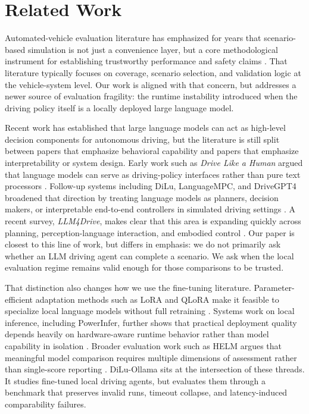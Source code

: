 \section{Related Work}

Automated-vehicle evaluation literature has emphasized for years that scenario-based simulation is not just a convenience layer, but a core methodological instrument for establishing trustworthy performance and safety claims \cite{riedmaier2020scenario}. That literature typically focuses on coverage, scenario selection, and validation logic at the vehicle-system level. Our work is aligned with that concern, but addresses a newer source of evaluation fragility: the runtime instability introduced when the driving policy itself is a locally deployed large language model.

Recent work has established that large language models can act as high-level decision components for autonomous driving, but the literature is still split between papers that emphasize behavioral capability and papers that emphasize interpretability or system design. Early work such as \emph{Drive Like a Human} argued that language models can serve as driving-policy interfaces rather than pure text processors \cite{fu2023drivelikehuman}. Follow-up systems including DiLu, LanguageMPC, and DriveGPT4 broadened that direction by treating language models as planners, decision makers, or interpretable end-to-end controllers in simulated driving settings \cite{wen2023dilu,sha2023languagempc,xu2023drivegpt4}. A recent survey, \emph{LLM4Drive}, makes clear that this area is expanding quickly across planning, perception-language interaction, and embodied control \cite{yang2023llm4drive}. Our paper is closest to this line of work, but differs in emphasis: we do not primarily ask whether an LLM driving agent can complete a scenario. We ask when the local evaluation regime remains valid enough for those comparisons to be trusted.

That distinction also changes how we use the fine-tuning literature. Parameter-efficient adaptation methods such as LoRA and QLoRA make it feasible to specialize local language models without full retraining \cite{hu2021lora,dettmers2023qlora}. Systems work on local inference, including PowerInfer, further shows that practical deployment quality depends heavily on hardware-aware runtime behavior rather than model capability in isolation \cite{song2023powerinfer}. Broader evaluation work such as HELM argues that meaningful model comparison requires multiple dimensions of assessment rather than single-score reporting \cite{liang2022helm}. DiLu-Ollama sits at the intersection of these threads. It studies fine-tuned local driving agents, but evaluates them through a benchmark that preserves invalid runs, timeout collapse, and latency-induced comparability failures.
